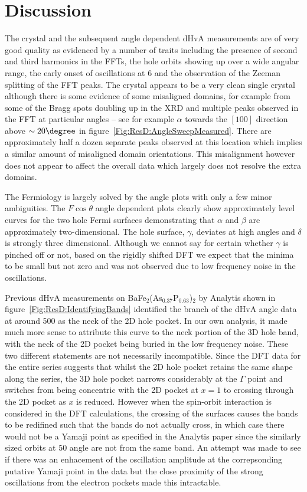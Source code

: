 
\section{Discussion}

The \BaFeP crystal and the subsequent angle dependent \ac{dHvA} measurements are of very good quality as evidenced by a number of traits including the presence of second and third harmonics in the \acp{FFT}, the hole orbits showing up over a wide angular range, the early onset of oscillations at \unit{6}{\tesla} and the observation of the Zeeman splitting of the \ac{FFT} peaks. The crystal appears to be a very clean single crystal although there is some evidence of some misaligned domains, for example from some of the Bragg spots doubling up in the \ac{XRD} and multiple peaks observed in the \ac{FFT} at particular angles -- see for example $\alpha$ towards the $[100]$ direction above $\sim 20\degree$ in figure~\ref{Fig:ResD:AngleSweepMeasured}. There are approximately half a dozen separate peaks observed at this location which implies a similar amount of misaligned domain orientations. This misalignment however does not appear to affect the overall data which largely does not resolve the extra domains.

The Fermiology is largely solved by the angle plots with only a few minor ambiguities.  The $F\cos \theta$ angle dependent plots clearly show approximately level curves for the two hole Fermi surfaces demonstrating that $\alpha$ and $\beta$ are approximately two-dimensional. The hole surface, $\gamma$, deviates at high angles and $\delta$ is strongly three dimensional. Although we cannot say for certain whether $\gamma$ is pinched off or not, based on the rigidly shifted \ac{DFT} we expect that the minima to be small but not zero and was not observed due to low frequency noise in the oscillations.

Previous \ac{dHvA} measurements on BaFe$_2$(As$_{0.37}$P$_{0.63}$)$_2$ by Analytis \etal shown in figure~\ref{Fig:ResD:IdentifyingBands} identified the branch of the \ac{dHvA} angle data at around \unit{500}{\tesla} as the neck of the 2D hole pocket. In our own analysis, it made much more sense to attribute this curve to the neck portion of the 3D hole band, with the neck of the 2D pocket being buried in the low frequency noise. These two different statements are not necessarily incompatible. Since the \ac{DFT} data for the entire series suggests that whilst the 2D hole pocket retains the same shape along the \BaFePAs series, the 3D hole pocket narrows considerably at the $\Gamma$ point and switches from being concentric with the 2D pocket at $x=1$ to crossing through the 2D pocket as $x$ is reduced. However when the spin-orbit interaction is considered in the \ac{DFT} calculations, the crossing of the surfaces causes the bands to be redifined such that the bands do not actually cross, in which case there would not be a Yamaji point as specified in the Analytis paper since the similarly sized orbits at \unit{50}{\degree} angle are not from the same band. An attempt was made to see if there was an enhacement of the oscillation amplitude at the correpsonding putative Yamaji point in the \BaFeP data but the close proximity of the strong oscillations from the electron pockets made this intractable.

